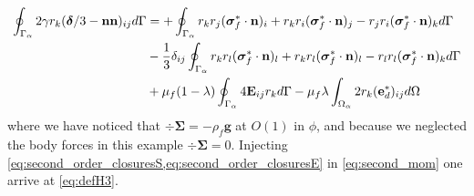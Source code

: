 \begin{align}
    \intS{2\gamma r_{k}(\bm\delta/3 - \textbf{nn})_{ij}}
    &= 
    +\intS{
        r_{k}r_{j} (\bm{\sigma}^*_f\cdot\textbf{n})_i 
        + r_{k}r_{i} (\bm{\sigma}^*_f\cdot\textbf{n})_j 
        - r_{j}r_{i} (\bm{\sigma}^*_f\cdot\textbf{n})_k 
    }\nonumber \\
    &-\frac{1}{3}\delta_{ij}\intS{
        r_{k}r_{l} (\bm{\sigma}^*_f\cdot\textbf{n})_l
        + r_{k}r_{l} (\bm{\sigma}^*_f\cdot\textbf{n})_l 
        - r_{l}r_{l} (\bm{\sigma}^*_f\cdot\textbf{n})_k 
    }\nonumber \\
    &+\mu_f (1-\lambda)\intS{ 4\textbf{E}_{ij} r_{k}  }
    - \mu_f\lambda \intO{2 r_{k}(\textbf{e}_d^*)_{ij}}
    \label{eq:second_mom}
\end{align}
where we have noticed that $ \div\bm\Sigma = -  \rho_f \textbf{g}$ at $O(1)$ in $\phi$, and because we neglected the body forces in this example  $\div\bm\Sigma =0$. 
Injecting \ref{eq:second_order_closuresS,eq:second_order_closuresE} in \ref{eq:second_mom} one arrive at \ref{eq:defH3}.


